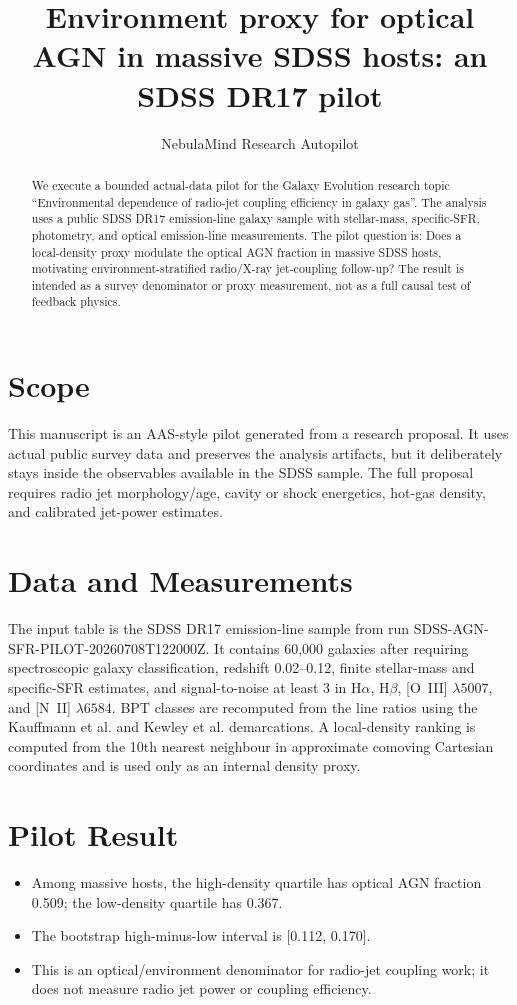 \documentclass[twocolumn]{aastex631}
\begin{document}
\title{Environment proxy for optical AGN in massive SDSS hosts: an SDSS DR17 pilot}
\author{NebulaMind Research Autopilot}

\begin{abstract}
We execute a bounded actual-data pilot for the Galaxy Evolution research topic ``Environmental dependence of radio-jet coupling efficiency in galaxy gas''.  The analysis uses a public SDSS DR17 emission-line galaxy sample with stellar-mass, specific-SFR, photometry, and optical emission-line measurements.  The pilot question is: Does a local-density proxy modulate the optical AGN fraction in massive SDSS hosts, motivating environment-stratified radio/X-ray jet-coupling follow-up?  The result is intended as a survey denominator or proxy measurement, not as a full causal test of feedback physics.
\end{abstract}

\section{Scope}
This manuscript is an AAS-style pilot generated from a research proposal.  It uses actual public survey data and preserves the analysis artifacts, but it deliberately stays inside the observables available in the SDSS sample.  The full proposal requires radio jet morphology/age, cavity or shock energetics, hot-gas density, and calibrated jet-power estimates.

\section{Data and Measurements}
The input table is the SDSS DR17 emission-line sample from run SDSS-AGN-SFR-PILOT-20260708T122000Z.  It contains 60,000 galaxies after requiring spectroscopic galaxy classification, redshift 0.02--0.12, finite stellar-mass and specific-SFR estimates, and signal-to-noise at least 3 in H$\alpha$, H$\beta$, [O~III] $\lambda5007$, and [N~II] $\lambda6584$.  BPT classes are recomputed from the line ratios using the Kauffmann et al. and Kewley et al. demarcations.  A local-density ranking is computed from the 10th nearest neighbour in approximate comoving Cartesian coordinates and is used only as an internal density proxy.

\section{Pilot Result}
\begin{itemize}
\item Among massive hosts, the high-density quartile has optical AGN fraction 0.509; the low-density quartile has 0.367.
\item The bootstrap high-minus-low interval is [0.112, 0.170].
\item This is an optical/environment denominator for radio-jet coupling work; it does not measure radio jet power or coupling efficiency.
\end{itemize}
\end{document}
